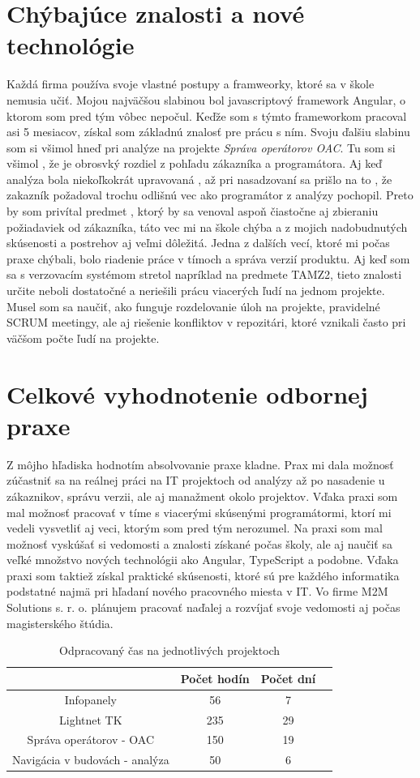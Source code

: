 \documentclass[11pt, oneside]{report}
\begin{document}
\section{Chýbajúce znalosti a nové technológie}
Každá firma používa  svoje vlastné postupy a framweorky, ktoré sa v škole  nemusia učiť. Mojou najväčšou slabinou bol javascriptový framework Angular, o ktorom som pred tým vôbec nepočul. Keďže som s týmto frameworkom pracoval  asi 5 mesiacov,  získal som základnú znalosť pre prácu s ním. Svoju ďalšiu slabinu som  si všimol  hneď pri analýze  na projekte \textit{Správa operátorov OAC}. Tu som si všimol , že je obrosvký rozdiel z pohľadu zákazníka a programátora. Aj keď analýza bola niekoľkokrát upravovaná , až pri nasadzovaní sa prišlo na to , že  zakazník požadoval  trochu odlišnú vec ako programátor z analýzy pochopil. Preto by som privítal predmet , ktorý by sa venoval aspoň čiastočne aj zbieraniu požiadaviek od zákazníka, táto vec mi na škole chýba a z mojich nadobudnutých skúsenosti a postrehov aj veľmi dôležitá.   Jedna z dalších vecí, ktoré mi počas praxe chýbali, bolo riadenie práce v tímoch a správa verzií produktu. Aj keď som sa s verzovacím systémom stretol napríklad na predmete TAMZ2, tieto znalosti určite neboli dostatočné a neriešili prácu viacerých ľudí na jednom projekte. Musel som sa naučiť, ako funguje rozdelovanie úloh na projekte, pravidelné SCRUM meetingy, ale aj riešenie konfliktov v repozitári, ktoré  vznikali často pri  väčšom počte ľudí na projekte.

\section{Celkové vyhodnotenie odbornej praxe}
Z môjho hľadiska  hodnotím absolvovanie praxe kladne. Prax mi  dala možnosť zúčastniť sa  na  reálnej práci  na IT projektoch od analýzy až po nasadenie u zákaznikov, správu verzii, ale aj manažment okolo projektov. Vďaka praxi som mal možnosť pracovať v tíme s viacerými skúsenými programátormi, ktorí mi vedeli vysvetliť aj veci, ktorým som pred tým nerozumel. Na praxi som mal možnosť vyskúšať si vedomosti a znalosti získané  počas školy, ale aj naučiť sa  veľké množstvo nových technológii ako Angular, TypeScript a podobne. Vďaka praxi som taktiež získal praktické skúsenosti, ktoré sú pre každého informatika podstatné najmä pri hľadaní nového pracovného miesta v IT.  Vo firme M2M Solutions s. r. o. plánujem pracovať naďalej  a rozvíjať svoje vedomosti aj počas magisterského štúdia.\\
\begin{table}[h!]
\centering
\begin{tabular}{|c | c | c | c|} 
 \hline
  & Počet hodín & Počet dní\\ [0.5ex] 
 \hline
 Infopanely & 56 & 7  \\ 
Lightnet TK & 235 & 29  \\
Správa operátorov - OAC & 150 & 19  \\
 Navigácia v budovách - analýza& 50 & 6   \\
 \hline
\end{tabular}
\label{tabHodiny}
\caption{Odpracovaný čas na jednotlivých projektoch}
\end{table}


\newpage
\thispagestyle{empty}
\nocite{*}
\clearpage

\printbibliography[title={Literatúra}]
\end{document}
